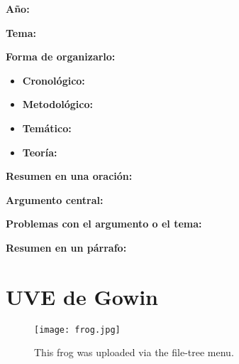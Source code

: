\documentclass{book}
\begin{document}
\textbf{Año:}

\textbf{Tema:}

\textbf{Forma de organizarlo:}

\begin{itemize}
\setlength{\itemindent}{0.5in}
    \item \textbf{Cronológico:} 
    \item \textbf{Metodológico:} 
    \item \textbf{Temático:} 
    \item \textbf{Teoría:} 
\end{itemize}

\textbf{Resumen en una oración:}

\textbf{Argumento central:}

\textbf{Problemas con el argumento o el tema:}

\textbf{Resumen en un párrafo:}

\section{UVE de Gowin}

\begin{figure}
\centering
\texttt{[image: frog.jpg]}
\caption{\label{fig:frog}This frog was uploaded via the file-tree menu.}
\end{figure}



\end{document}
